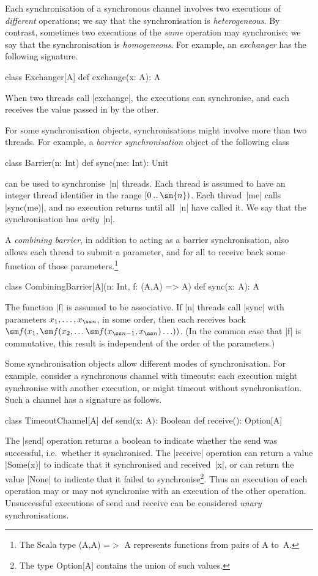 Each synchronisation of a synchronous channel involves two executions of
\emph{different} operations; we say that the synchronisation is
\emph{heterogeneous}.  By contrast, sometimes two executions of the
\emph{same} operation may synchronise; we say that the synchronisation is
\emph{homogeneous}.  For example, an \emph{exchanger} has the following
signature.
%
\begin{scala}
class Exchanger[A]{
  def exchange(x: A): A
}
\end{scala}
%
When two threads call |exchange|, the executions can synchronise, and each
receives the value passed in by the other.

For some synchronisation objects, synchronisations might involve more than two
threads.  For example, a \emph{barrier synchronisation} object of the
following class
%
\begin{scala}
class Barrier(n: Int){
  def sync(me: Int): Unit
}
\end{scala}
%
can be used to synchronise~|n| threads.  Each thread is assumed to have an
integer thread identifier in the range $\range{0}{\sm{n}}$.  Each thread~|me|
calls |sync(me)|, and no execution returns until all~|n| have called it.  We
say that the synchronisation has \emph{arity}~|n|.

A \emph{combining barrier}, in addition to acting as a barrier
synchronisation, also allows each thread to submit a parameter, and for all to
receive back some function of those parameters.\footnote{The Scala type
  {\scalastyle (A,A) =}$>$ {\scalastyle A} represents functions from pairs of
  {\scalastyle A} to~{\scalastyle A}.}
%
\begin{scala}
class CombiningBarrier[A](n: Int, f: (A,A) => A){
  def sync(x: A): A
}
\end{scala}
%
The function |f| is assumed to be associative.  If |n| threads call |sync|
with parameters $x_1, \ldots, x_{\ss n}$, in some order, then each receives
back $\sm f(x_1, \sm f(x_2, \ldots \sm f(x_{{\ss n}-1}, x_{\ss n}) \ldots ))$.
(In the common case that |f| is commutative, this result is independent of the
order of the parameters.)

Some synchronisation objects allow different modes of synchronisation.  For
example, consider a synchronous channel with timeouts: each execution might
synchronise with another execution, or might timeout without
synchronisation.  Such a channel has a signature as follows.
%
\begin{scala}
class TimeoutChannel[A]{
  def send(x: A): Boolean
  def receive(): Option[A]
}
\end{scala}
%
The |send| operation returns a boolean to indicate whether the send was
successful, i.e.~whether it synchronised.  The |receive| operation can return
a value |Some(x)| to indicate that it synchronised and received~|x|, or can
return the value |None| to indicate that it failed to synchronise\footnote{The
  type {\scalashape Option[A]} contains the union of such values.}.  Thus an
execution of each operation may or may not synchronise with an execution of
the other operation.  Unsuccessful executions of send and receive
can be considered \emph{unary} synchronisations.  

